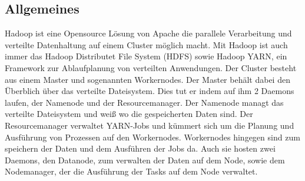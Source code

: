 \documentclass[12pt,twoside,a4paper,parskip]{scrbook}
\begin{document}
\subsection{Allgemeines}
Hadoop ist eine Opensource Lösung von Apache die parallele Verarbeitung und verteilte Datenhaltung auf einem Cluster möglich macht. Mit Hadoop ist auch immer das Hadoop Distributet File System (HDFS) sowie Hadoop YARN, ein Framework zur Ablaufplanung von verteilten Anwendungen. \newline
Der Cluster besteht aus einem Master und sogenannten Workernodes. Der Master behält dabei den Überblich über das verteilte Dateisystem. Dies tut er indem auf ihm 2 Daemons laufen, der Namenode und der Resourcemanager. Der Namenode managt das verteilte Dateisystem und weiß wo die gespeicherten Daten sind. Der Resourcemanager verwaltet YARN-Jobs und kümmert sich um die Planung und Ausführung von Prozessen auf den Workernodes. \newline
Workernodes hingegen sind zum speichern der Daten und dem Ausführen der Jobs da. Auch sie hosten zwei Daemons, den Datanode, zum verwalten der Daten auf dem Node, sowie dem Nodemanager, der die Ausführung der Tasks auf dem Node verwaltet.
\end{document}
